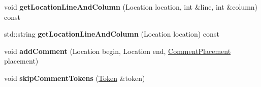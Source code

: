 \begin{DoxyCompactItemize}
\item 
\hypertarget{class_json_1_1_reader_a20b3023dc422726e2e4ebe41b8ba0515}{}void {\bfseries get\+Location\+Line\+And\+Column} (Location location, int \&line, int \&column) const \label{class_json_1_1_reader_a20b3023dc422726e2e4ebe41b8ba0515}

\item 
\hypertarget{class_json_1_1_reader_ac5b4b5a76d3224871519b0656393b35b}{}std\+::string {\bfseries get\+Location\+Line\+And\+Column} (Location location) const \label{class_json_1_1_reader_ac5b4b5a76d3224871519b0656393b35b}

\item 
\hypertarget{class_json_1_1_reader_aaea3bd62d12ffb6117a61476c0685049}{}void {\bfseries add\+Comment} (Location begin, Location end, \hyperlink{namespace_json_a4fc417c23905b2ae9e2c47d197a45351}{Comment\+Placement} placement)\label{class_json_1_1_reader_aaea3bd62d12ffb6117a61476c0685049}

\item 
\hypertarget{class_json_1_1_reader_a22e677ef400d8223f27e631b4cd4b821}{}void {\bfseries skip\+Comment\+Tokens} (\hyperlink{class_json_1_1_reader_1_1_token}{Token} \&token)\label{class_json_1_1_reader_a22e677ef400d8223f27e631b4cd4b821}

\end{DoxyCompactItemize}
